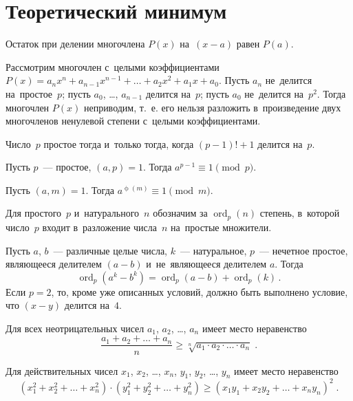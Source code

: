 
\section*{Теоретический минимум}

\begingroup
    \def\iconst{\mathrm{i}}%
    \ifdefined\mathup
        \def\eulerphi{\mathup{\phi}}%
    \else
        \def\eulerphi{\upphi}%
    \fi
    \def\ord{\operatorname{ord}}%

Остаток при делении многочлена $P(x)$ на~$(x - a)$ равен $P(a)$.

Рассмотрим многочлен с~целыми коэффициентами
\(
    P(x)
=
    a_{n} x^{n} + a_{n-1} x^{n-1} + \ldots + a_{2} x^{2} + a_{1} x + a_{0}
\).
Пусть $a_{n}$ не~делится на~простое~$p$;
пусть $a_{0}$, \ldots, $a_{n-1}$ делится на~$p$;
пусть $a_0$ не~делится на~$p^2$.
Тогда многочлен $P(x)$ неприводим, т.~е. его нельзя разложить в~произведение
двух многочленов ненулевой степени с~целыми коэффициентами.

Число~$p$ простое тогда и~только тогда, когда $(p - 1)! + 1$ делится на~$p$.

Пусть $p$~--- простое, $(a, p) = 1$.
Тогда $a^{p-1} \equiv 1 \pmod p$.

Пусть $(a, m) = 1$.
Тогда $a^{\eulerphi(m)} \equiv 1 \pmod m$.

Для простого~$p$ и~натурального~$n$ обозначим за $\ord_{p}(n)$ степень,
в~которой число~$p$ входит в~разложение числа~$n$ на~простые множители.

Пусть $a$, $b$~--- различные целые числа, $k$~--- натуральное,
$p$~--- нечетное простое, являющееся делителем $(a - b)$ и~не~являющееся
делителем $a$.
Тогда
\[
    \ord_{p}(a^{k} - b^{k})
=
    \ord_{p}(a - b) + \ord_{p}(k)
\, . \]
Если $p = 2$, то, кроме уже описанных условий, должно быть выполнено условие,
что $(x - y)$ делится на~$4$.

Для всех неотрицательных чисел $a_{1}$, $a_{2}$, \ldots, $a_{n}$ имеет место
неравенство
\[
    \frac{a_{1} + a_{2} + \ldots + a_{n}}{n}
\geq
    \sqrt[n]{a_{1} \cdot a_{2} \cdot \ldots \cdot a_{n}}
\; . \]

Для действительных чисел $x_{1}$, $x_{2}$, \ldots, $x_{n}$,
$y_{1}$, $y_{2}$, \ldots, $y_{n}$ имеет место неравенство
\[
    (x_{1}^2 + x_{2}^2 + \ldots + x_{n}^2)
    \cdot
    (y_{1}^2 + y_{2}^2 + \ldots + y_{n}^2)
\geq
    (x_{1} y_{1} + x_{2} y_{2} + \ldots + x_{n} y_{n})^2
\; . \]

